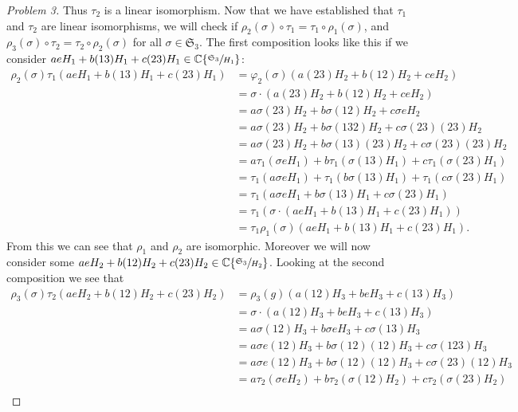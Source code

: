 \documentclass[titlepage]{article}
\theoremstyle{plain}
\theoremstyle{definition}
\theoremstyle{remark}
\theoremstyle{exercise-style}
\numberwithin{equation}{section}
\numberwithin{theorem}{section}
\numberwithin{remark}{section}
\begin{document}
\begin{proof}[Problem 3]
    Thus $\tau_2$ is a linear isomorphism. Now that we have established that $\tau_1$ and $\tau_2$ are linear isomorphisms, we will check if $\rho_2(\sigma)\circ \tau_1 = \tau_1 \circ \rho_1(\sigma)$, and $\rho_3(\sigma) \circ \tau_2 = \tau_2 \circ \rho_2(\sigma)$ for all $\sigma \in \mathfrak{S}_3$. The first composition looks like this if we consider $a eH_1 + b(13)H_1 + c(23)H_1 \in \mathbb{C}\{ \sfrac{\mathfrak{S}_3}{H_1} \}$:
    \begin{align}
        \rho_2(\sigma) \tau_1(a eH_1 + b(13)H_1 + c(23)H_1) &= \varphi_2(\sigma)(a(23)H_2 + b(12)H_2 + c eH_2) \\
        &= \sigma \cdot \left ( a(23)H_2 + b(12)H_2 + c eH_2 \right ) \\
        &= a \sigma (23)H_2 + b\sigma (12)H_2 + c\sigma eH_2 \\
        &= a \sigma (23)H_2 + b\sigma (132)H_2 + c\sigma (23)(23)H_2 \\
        &= a \sigma (23)H_2 + b\sigma (13)(23)H_2 + c\sigma (23)(23)H_2 \\
        &= a \tau_1(\sigma eH_1) + b\tau_1(\sigma (13)H_1) + c\tau_1(\sigma (23)H_1) \\
        &= \tau_1(a\sigma eH_1) + \tau_1(b\sigma (13)H_1) + \tau_1(c\sigma (23)H_1) \\
        &= \tau_1 (a\sigma eH_1 + b\sigma (13)H_1 + c\sigma(23)H_1) \\
        &= \tau_1(\sigma \cdot (a eH_1 + b(13)H_1 + c(23)H_1)) \\
        &= \tau_1 \rho_1 (\sigma) (a eH_1 + b(13)H_1 + c(23)H_1).
    \end{align}
    From this we can see that $\rho_1$ and $\rho_2$ are isomorphic. Moreover we will now consider some $a eH_2 + b(12)H_2 + c(23)H_2 \in \mathbb{C}\{ \sfrac{\mathfrak{S}_3}{H_2} \}$. Looking at the second composition we see that
    \begin{align}
        \rho_3(\sigma) \tau_2(a eH_2 + b(12)H_2 + c(23)H_2) &= \rho_3(g)(a(12)H_3 + b eH_3 + c(13)H_3) \\
        &= \sigma \cdot (a(12)H_3 + b eH_3 + c(13)H_3) \\
        &= a\sigma(12)H_3 + b\sigma eH_3 + c\sigma (13)H_3 \\
        &= a\sigma e(12)H_3 + b\sigma (12)(12)H_3 + c\sigma (123)H_3 \\
        &= a\sigma e(12)H_3 + b\sigma (12)(12)H_3 + c\sigma (23)(12)H_3 \\
        &= a\tau_2(\sigma eH_2) + b\tau_2(\sigma (12)H_2) + c\tau_2( \sigma(23)H_2) \\

\end{align}
\end{proof}
\end{document}
